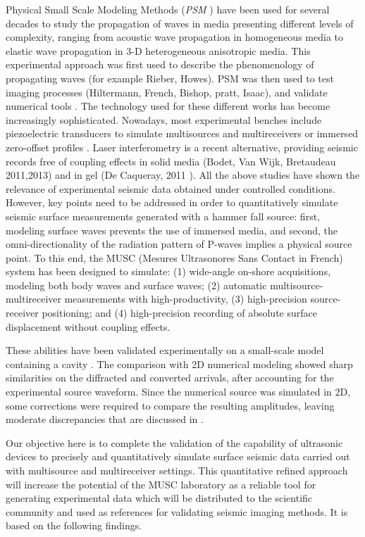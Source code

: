 \documentclass[paper,extra]{gji} %
\newcommand{\psm}{\textit{PSM} }
\newcommand{\thrd}{3-D }
\begin{document}
\noindent Physical Small Scale Modeling Methods (\psm) have been used for several decades to study the propagation of waves in media presenting different levels of complexity, ranging from acoustic wave propagation in homogeneous media to elastic wave propagation in \thrd heterogeneous anisotropic media. This experimental approach was first used to describe the phenomenology of propagating waves (for example Rieber, Howes). PSM was then used to test imaging processes (Hiltermann, French, Bishop, pratt, Isaac), and validate numerical tools \citep{Favretto_NMT_2013}. The technology used for these different works has become increasingly sophisticated. Nowadays, most experimental benches include piezoelectric transducers to simulate multisources and multireceivers \citep{Wong_SPM_2009} or immersed zero-offset profiles \citep{Favretto_NMT_2013}. Laser interferometry is a recent alternative, providing seismic records free of coupling effects in solid media (Bodet, Van Wijk, Bretaudeau 2011,2013) and in gel (De Caqueray, 2011 ). All the above studies have shown the relevance of experimental seismic data obtained under controlled conditions. However, key points need to be addressed in order to quantitatively simulate seismic surface measurements generated with a hammer fall source: first, modeling surface waves prevents the use of immersed media, and second, the omni-directionality of the radiation pattern of P-waves implies a physical source point. To this end, the MUSC (Mesures Ultrasonores Sans Contact in French) system has been designed \citep{Bretaudeau_SSM_2011} to simulate: (1) wide-angle on-shore acquisitions, modeling both body waves and surface waves; (2) automatic multisource-multireceiver measurements with high-productivity, (3) high-precision source-receiver positioning; and (4) high-precision recording of absolute surface displacement without coupling effects. 

\noindent These abilities have been validated experimentally on a small-scale model containing a cavity \citep{Bretaudeau_SSM_2011}. The comparison with 2D numerical modeling showed sharp similarities on the diffracted and converted arrivals, after accounting for the experimental source waveform. Since the numerical source was simulated in 2D, some corrections were required to compare the resulting amplitudes, leaving moderate discrepancies that are discussed in \citet{Bretaudeau_SSM_2011}. 

\noindent Our objective here is to complete the validation of the capability of ultrasonic devices to precisely and quantitatively simulate surface seismic data carried out with multisource and multireceiver settings. This quantitative refined approach will increase the potential of the MUSC laboratory as a reliable tool for generating experimental data which will be distributed to the scientific community and used as references for validating seismic imaging methods. It is based on the following findings.
\end{document}
